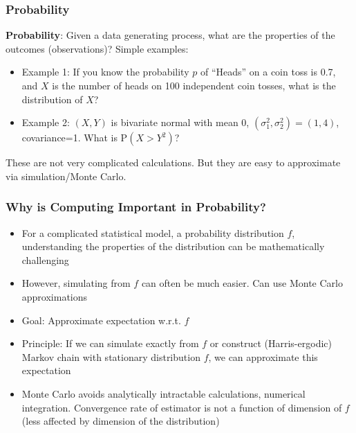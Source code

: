 \documentclass{beamer}
\begin{document}
\begin{frame}
  \frametitle{Probability}
  {\bf Probability}: Given a data generating process, what are the
  properties of the outcomes (observations)? Simple examples:
\begin{itemize}
\item Example 1: If you know the probability $p$ of ``Heads'' on a coin
  toss is 0.7, and $X$ is the number of heads on 100 independent coin tosses, what is the
  distribution of $X$?
\item Example 2: $(X,Y)$ is bivariate normal with mean 0,
  $(\sigma_1^2,\sigma_2^2)=(1,4)$, covariance=1. What is P$(X>Y^2)$?
\end{itemize}
These are not very complicated calculations. But they are easy to
approximate via simulation/Monte Carlo.
\end{frame}


\begin{frame}
\frametitle{Why is Computing Important in Probability?}
\begin{itemize}
\item For a complicated statistical model, a probability distribution
  $f$, understanding the properties of the distribution can be
  mathematically challenging
\item However, simulating from $f$ can often be much
  easier. Can use Monte Carlo approximations
\item Goal: Approximate expectation w.r.t. $f$
\item Principle: If we can simulate exactly from $f$ or construct
  (Harris-ergodic) Markov chain with stationary distribution $f$, we
  can approximate this expectation
\item Monte Carlo avoids analytically intractable calculations, numerical
  integration. Convergence rate of estimator is not a function of dimension of
  $f$ (less affected by dimension of the distribution)
\end{itemize}
\end{frame}
\end{document}
